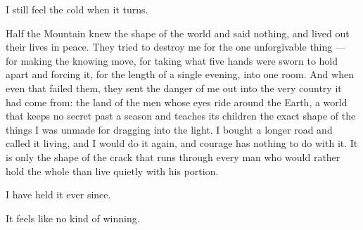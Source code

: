 I still feel the cold when it turns.\par

Half the Mountain knew the shape of the world and said nothing, and lived out their lives in peace. They tried to destroy me for the one unforgivable thing --- for making the knowing move, for taking what five hands were sworn to hold apart and forcing it, for the length of a single evening, into one room. And when even that failed them, they sent the danger of me out into the very country it had come from: the land of the men whose eyes ride around the Earth, a world that keeps no secret past a season and teaches its children the exact shape of the things I was unmade for dragging into the light. I bought a longer road and called it living, and I would do it again, and courage has nothing to do with it. It is only the shape of the crack that runs through every man who would rather hold the whole than live quietly with his portion.\par

I have held it ever since.\par

It feels like no kind of winning.\par

\ornament
